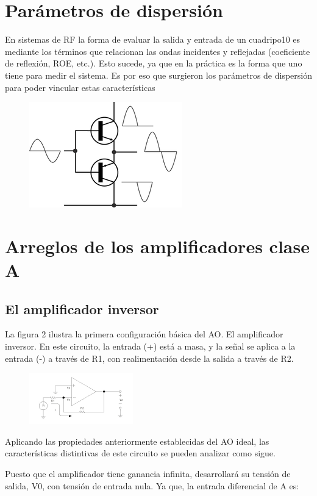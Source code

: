 \documentclass[10pt,letterpaper]{article}
\begin{document}
\section{Parámetros de dispersión}
En sistemas de RF la forma de evaluar la salida y entrada de un cuadripo10 es mediante los
términos que relacionan las ondas incidentes y reflejadas (coeficiente de reflexión, ROE,
etc.). Esto sucede, ya que en la práctica es la forma que uno tiene para medir el sistema. Es
por eso que surgieron los parámetros de dispersión para poder vincular estas características
\begin{figure}[h!]
\centering
\includegraphics[scale=1]{250px-Electronic_Amplifier_Push-pull}
\end{figure}
\section{Arreglos de los amplificadores clase A}
\subsection*{El amplificador inversor}
La figura 2 ilustra la primera configuración básica del AO. El amplificador inversor. En este circuito, la entrada (+) está a masa, y la señal se aplica a la entrada (-) a través de R1, con realimentación desde la salida a través de R2.
\begin{figure}[h!]
\centering
\includegraphics[scale=1.5]{unnamed}
\end{figure}
Aplicando las propiedades anteriormente establecidas del AO ideal, las características distintivas de este circuito se pueden analizar como sigue.

Puesto que el amplificador tiene ganancia infinita, desarrollará su tensión de salida, V0, con tensión de entrada nula. Ya que, la entrada diferencial de A es:
\end{document}
